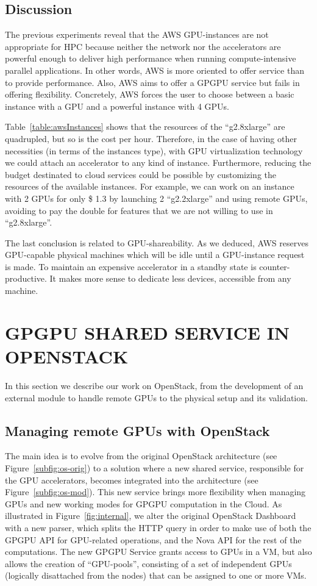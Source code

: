 \documentclass[a4paper,twoside]{article}
\begin{document}
\subsection{Discussion}
The previous experiments reveal that the AWS GPU-instances are not appropriate for HPC
because neither the network nor the accelerators are powerful enough to deliver high performance
when running compute-intensive parallel applications. 
In other words, AWS is more oriented to offer service than to provide performance.
Also, AWS aims to offer a GPGPU service but fails in offering flexibility.
Concretely, AWS forces the user to choose between a basic instance with a GPU and a powerful instance with 4 GPUs.

Table~\ref{table:awsInstances} shows that the resources of the ``g2.8xlarge'' are quadrupled, but so is the cost per hour.
Therefore, in the case of having other necessities (in terms of the instances type), with GPU virtualization technology we could attach an accelerator to any kind of instance.
Furthermore, reducing the budget destinated to cloud services could be possible by customizing the resources of the available instances.
For example, we can work on an instance with 2 GPUs for only \$ 1.3 by launching 2 ``g2.2xlarge'' and using remote GPUs, avoiding to pay the double for features that we are not willing to use in ``g2.8xlarge''.

The last conclusion is related to GPU-shareability. 
As we deduced, AWS reserves GPU-capable physical machines which will be idle until a GPU-instance request is made.
To maintain an expensive accelerator in a standby state is counter-productive. 
It makes more sense to dedicate less devices, accessible from any machine.

\section{\uppercase{GPGPU Shared Service in OpenStack}}
\label{sec:gpgpuOS}
In this section we describe our work on OpenStack, from the development of an external module to handle remote GPUs to the physical setup and its validation.

\subsection{Managing remote GPUs with OpenStack}
The main idea is to evolve from the original OpenStack architecture (see Figure~\ref{subfig:os-orig})
 to a solution where a new shared service, responsible for the GPU accelerators, becomes integrated into the architecture (see Figure~\ref{subfig:os-mod}).
This new service brings more flexibility when managing GPUs and new working modes for GPGPU computation in the Cloud.
As illustrated in Figure~\ref{fig:internal}, we alter the original OpenStack Dashboard with a new parser, 
which splits the HTTP query in order to make use of both the GPGPU API for GPU-related operations, and the Nova API for the rest of the computations. 
The new GPGPU Service grants access to GPUs in a VM, but also allows the creation of ``GPU-pools'', consisting of a set of independent GPUs (logically disattached from the nodes) that can be assigned to one or more VMs.
\end{document}
